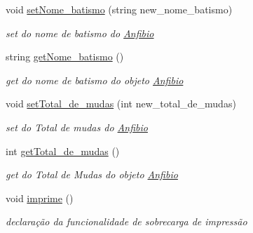 \begin{DoxyCompactItemize}
void \mbox{\hyperlink{class_anfibio_a7a547d2737f260126110667e2885572f}{set\+Nome\+\_\+batismo}} (string new\+\_\+nome\+\_\+batismo)
\begin{DoxyCompactList}\small\item\em set do nome de batismo do \mbox{\hyperlink{class_anfibio}{Anfibio}} \end{DoxyCompactList}\item 
string \mbox{\hyperlink{class_anfibio_ae7f36199c2619b68c1cebd8557c77cb5}{get\+Nome\+\_\+batismo}} ()
\begin{DoxyCompactList}\small\item\em get do nome de batismo do objeto \mbox{\hyperlink{class_anfibio}{Anfibio}} \end{DoxyCompactList}\item 
void \mbox{\hyperlink{class_anfibio_a5b8ad6d83082f10ff2b8bd92ccff2753}{set\+Total\+\_\+de\+\_\+mudas}} (int new\+\_\+total\+\_\+de\+\_\+mudas)
\begin{DoxyCompactList}\small\item\em set do Total de mudas do \mbox{\hyperlink{class_anfibio}{Anfibio}} \end{DoxyCompactList}\item 
int \mbox{\hyperlink{class_anfibio_a1930bcc1ef46d0aa34374ba5c24db720}{get\+Total\+\_\+de\+\_\+mudas}} ()
\begin{DoxyCompactList}\small\item\em get do Total de Mudas do objeto \mbox{\hyperlink{class_anfibio}{Anfibio}} \end{DoxyCompactList}\item 
\mbox{\label{class_anfibio_a46e8b36e429730e1db894a113176b00f}} 
void \mbox{\hyperlink{class_anfibio_a46e8b36e429730e1db894a113176b00f}{imprime}} ()
\begin{DoxyCompactList}\small\item\em declaração da funcionalidade de sobrecarga de impressão \end{DoxyCompactList}\end{DoxyCompactItemize}
